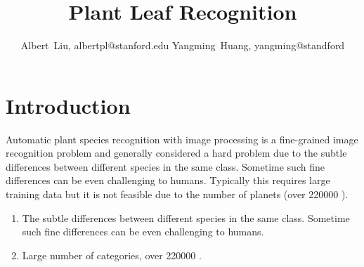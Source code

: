 \documentclass[journal]{IEEEtran}
\begin{document}
%
\title{Plant Leaf Recognition}
%
%
%
\author{Albert~Liu, albertpl@stanford.edu
        Yangming~Huang, yangming@standford}%

%
%


\maketitle


\section{Introduction}
Automatic plant species recognition with image processing is a fine-grained image recognition problem and generally considered a hard problem due to the subtle differences between different species in the same class. Sometime such fine differences can be even challenging to humans. Typically this requires large training data but it is not feasible due to the number of planets (over 220000 \cite{Charles13}).
\begin{enumerate}
  \item The subtle differences between different species in the same class. Sometime such fine differences can be even challenging to humans.
  \item Large number of categories, over 220000 \cite{Charles13}.
\end{enumerate}
\end{document}
